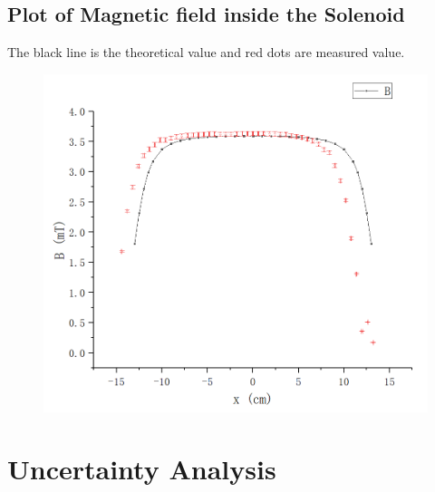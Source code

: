 \documentclass[12pt]{article}
\begin{document}
\subsection{Plot of Magnetic field inside the Solenoid}
The black line is the theoretical value and red dots are measured value.
\begin{figure}[H]
\centering
\includegraphics[scale=0.4]{P9.jpg}
\end{figure}
\section{Uncertainty Analysis}
\end{document}
